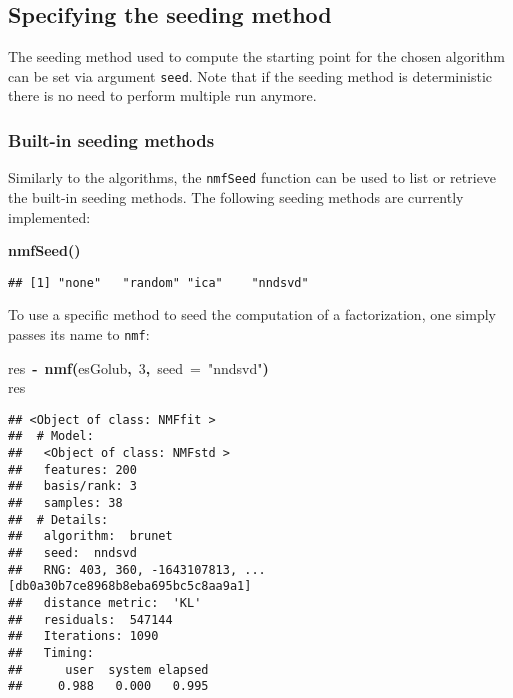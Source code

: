 \documentclass[a4paper]{article}\usepackage{graphicx, color}
\makeatletter
\newcommand{\hlnumber}[1]{\textcolor[rgb]{0,0,0}{#1}}%
\newcommand{\hlfunctioncall}[1]{\textcolor[rgb]{0.501960784313725,0,0.329411764705882}{\textbf{#1}}}%
\newcommand{\hlstring}[1]{\textcolor[rgb]{0.6,0.6,1}{#1}}%
\newcommand{\hlkeyword}[1]{\textcolor[rgb]{0,0,0}{\textbf{#1}}}%
\newcommand{\hlargument}[1]{\textcolor[rgb]{0.690196078431373,0.250980392156863,0.0196078431372549}{#1}}%
\newcommand{\hlassignement}[1]{\textcolor[rgb]{0,0,0}{\textbf{#1}}}%
\newcommand{\hlsymbol}[1]{\textcolor[rgb]{0,0,0}{#1}}%
\newcommand{\hlstd}[1]{\textcolor[rgb]{0,0,0}{#1}}%
\newenvironment{kframe}{%
 \def\FrameCommand##1{\hskip\@totalleftmargin \hskip-\fboxsep
 \colorbox{shadecolor}{##1}\hskip-\fboxsep
     \hskip-\linewidth \hskip-\@totalleftmargin \hskip\columnwidth}%
 \MakeFramed {\advance\hsize-\width
   \@totalleftmargin\z@ \linewidth\hsize
   \@setminipage}}%
 {\par\unskip\endMakeFramed}
\newenvironment{knitrout}{}{} %
\let\code=\texttt
\makeatother
\begin{document}
\subsection{Specifying the seeding method}\label{sec:seed}
The seeding method used to compute the starting point for the chosen algorithm can be set via argument \code{seed}. 
Note that if the seeding method is deterministic there is no need to perform multiple run anymore.

\subsubsection{Built-in seeding methods}
Similarly to the algorithms, the \code{nmfSeed} function can be used to list or retrieve the built-in seeding methods.
The following seeding methods are currently implemented:

\begin{knitrout}
\color{fgcolor}\begin{kframe}
\begin{flushleft}
\ttfamily\noindent
\hlfunctioncall{nmfSeed}\hlkeyword{(}\hlkeyword{)}\mbox{}
\normalfont
\end{flushleft}
\begin{verbatim}
## [1] "none"   "random" "ica"    "nndsvd"
\end{verbatim}
\end{kframe}
\end{knitrout}


To use a specific method to seed the computation of a factorization, one simply passes its name to \code{nmf}:

\begin{knitrout}
\color{fgcolor}\begin{kframe}
\begin{flushleft}
\ttfamily\noindent
\hlsymbol{res}{\ }\hlassignement{\usebox{\hlnormalsizeboxlessthan}-}{\ }\hlfunctioncall{nmf}\hlkeyword{(}\hlsymbol{esGolub}\hlkeyword{,}{\ }\hlnumber{3}\hlkeyword{,}{\ }\hlargument{seed}{\ }\hlargument{=}{\ }\hlstring{"{}nndsvd"{}}\hlkeyword{)}\hspace*{\fill}\\
\hlstd{}\hlsymbol{res}\mbox{}
\normalfont
\end{flushleft}
\begin{verbatim}
## <Object of class: NMFfit >
##  # Model:
##   <Object of class: NMFstd >
##   features: 200 
##   basis/rank: 3 
##   samples: 38 
##  # Details:
##   algorithm:  brunet 
##   seed:  nndsvd 
##   RNG: 403, 360, -1643107813, ... [db0a30b7ce8968b8eba695bc5c8aa9a1]
##   distance metric:  'KL' 
##   residuals:  547144 
##   Iterations: 1090 
##   Timing:
##      user  system elapsed 
##     0.988   0.000   0.995 
\end{verbatim}
\end{kframe}
\end{knitrout}
\end{document}
